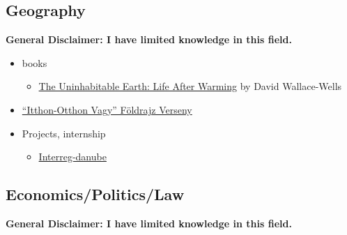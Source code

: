 \documentclass{article}
\begin{document}
\subsection{Geography}
\textbf{General Disclaimer: I have limited knowledge in this field.}


\begin{itemize}
    \item books
    \begin{itemize}
        \item \href{https://www.goodreads.com/tr/book/show/41552709-the-uninhabitable-earth}{The Uninhabitable Earth: Life After Warming} by David Wallace-Wells
    \end{itemize}
    \item \href{http://eotvos-tata.edu.hu/versenyek/foldrajz/itthonotthon_index.htm}{``Itthon-Otthon Vagy'' Földrajz Verseny}
    \item Projects, internship
    \begin{itemize}
        \item \href{http://www.interreg-danube.eu/approved-projects/tid-y-up/partners}{Interreg-danube}
    \end{itemize}
\end{itemize}

\subsection{Economics/Politics/Law}
\textbf{General Disclaimer: I have limited knowledge in this field.}
\end{document}
